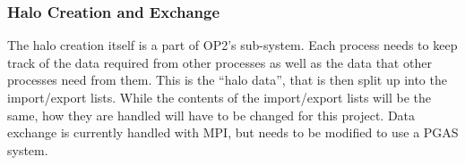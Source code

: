 \subsubsection{Halo Creation and Exchange}\label{halo_creation_exchange} %

The halo creation itself is a part of OP2's sub-system. Each process needs to keep track of the data required from other processes as well as the data that other processes need from them. This is the ``halo data'', that is then split up into the import/export lists. While the contents of the import/export lists will be the same, how they are handled will have to be changed for this project. Data exchange is currently handled with MPI, but needs to be modified to use a PGAS system.

